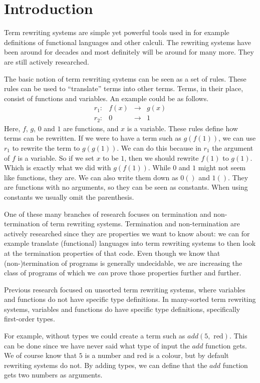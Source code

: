 \chapter{Introduction}\label{introduction}
Term rewriting systems are simple yet powerful tools used in for example definitions of functional languages and other calculi. The rewriting systems have been around for decades and most definitely will be around for many more. They are still actively researched. 

The basic notion of term rewriting systems can be seen as a set of rules. These rules can be used to ``translate'' terms into other terms. Terms, in their place, consist of functions and variables. An example could be as follows.
\[
\begin{array}{lrcl}
r_1: & f(x) & \rightarrow & g(x) \\
r_2: & 0 & \rightarrow & 1
\end{array}
\]
Here, $f$, $g$, $0$ and $1$ are functions, and $x$ is a variable. These rules define how terms can be rewritten. If we were to have a term such as $g(f(1))$, we can use $r_1$ to rewrite the term to $g(g(1))$. We can do this because in $r_1$ the argument of $f$ is a variable. So if we set $x$ to be $1$, then we should rewrite $f(1)$ to $g(1)$. Which is exactly what we did with $g(f(1))$. While $0$ and $1$ might not seem like functions, they are. We can also write them down as $0()$ and $1()$. They are functions with no arguments, so they can be seen as constants. When using constants we usually omit the parenthesis. 

One of these many branches of research focuses on termination and non-termination of term rewriting systems. Termination and non-termination are actively researched since they are properties we want to know about: we can for example translate (functional) languages into term rewriting systems to then look at the termination properties of that code. Even though we know that (non-)termination of programs is generally undecidable, we are increasing the class of programs of which we \textit{can} prove those properties further and further.

Previous research focused on unsorted term rewriting systems, where variables and functions do not have specific type definitions. In many-sorted term rewriting systems, variables and functions do have specific type definitions, specifically first-order types. 

For example, without types we could create a term such as $add(5, \text{ red})$. This can be done since we have never said what type of input the $add$ function gets. We of course know that $5$ is a number and red is a colour, but by default rewriting systems do not. By adding types, we can define that the $add$ function gets two numbers as arguments.

